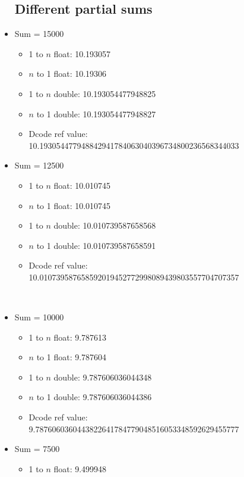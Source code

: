 \documentclass[12pt]{article}
\begin{document}
\begin{itemize}
\break
\subsection*{Different partial sums}
\item Sum = 15000
\begin{itemize}

\item 1 to $n$ float: 10.193057
\item $n$ to 1 float: 10.19306
\\
\item 1 to $n$ double: 10.193054477948825
\item $n$ to 1 double: 10.193054477948827
\\
\item Dcode ref value: 10.193054477948842941784063040396734800236568344033
\\
\end{itemize}
\item Sum = 12500
\begin{itemize}
\item 1 to $n$ float: 10.010745
\item $n$ to 1 float: 10.010745
\\
\item 1 to $n$ double: 10.010739587658568
\item $n$ to 1 double: 10.010739587658591
\\
\item Dcode ref value: 10.010739587658592019452772998089439803557704707357
\end{itemize}
\\
\item Sum = 10000
\begin{itemize}
\item 1 to $n$ float: 9.787613
\item $n$ to 1 float: 9.787604
\\
\item 1 to $n$ double: 9.787606036044348
\item $n$ to 1 double: 9.787606036044386
\\
\item Dcode ref value: 9.7876060360443822641784779048516053348592629455777
\end{itemize}
\break
\item Sum = 7500
\begin{itemize}
\item 1 to $n$ float: 9.499948

\end{itemize}
\end{itemize}
\end{document}
